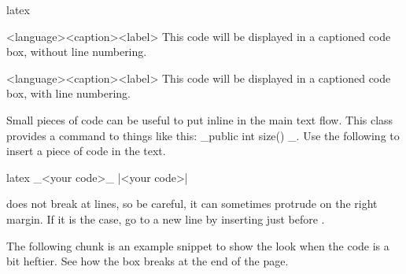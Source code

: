 \documentclass[raggedright, twoside, 11pt]{tufte-style-article}
\begin{document}
\begin{codebox}{latex}
\begin{snippet}{<language>}{<caption>}{<label>}
This code will be displayed in a captioned code box, without line numbering.
\end{snippet}

\begin{snippetnum}{<language>}{<caption>}{<label>}
This code will be displayed in a captioned code box, with line numbering.
\end{snippetnum}	
\end{codebox}

Small pieces of code can be useful to put inline in the main text flow. This class provides a command to things like this: _public int size() {}_. Use the following to insert a piece of code in the text.


\begin{codebox}{latex}
_<your code>_ %
|<your code>|
\end{codebox}

 does not break at lines, so be careful, it can sometimes protrude on the right margin. If it is the case, go to a new line by inserting  just before .


The following chunk is an example snippet to show the look when the code is a bit heftier. See how the box breaks at the end of the page.
\end{document}

